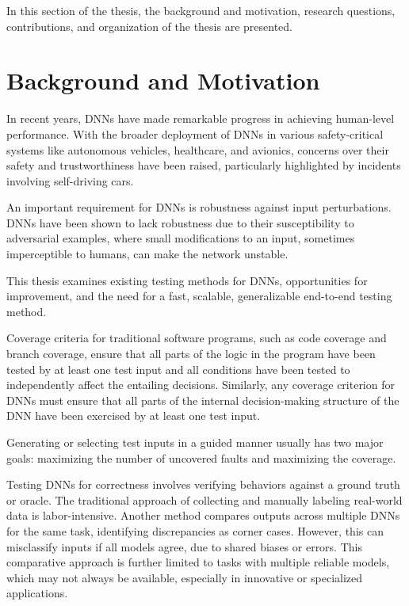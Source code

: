 In this section of the thesis, the background and motivation, research questions, contributions, and organization of the thesis are presented.

\section{Background and Motivation}

In recent years, DNNs have made remarkable progress in achieving human-level performance. With the broader deployment of DNNs in various safety-critical systems like autonomous vehicles, healthcare, and avionics, concerns over their safety and trustworthiness have been raised, particularly highlighted by incidents involving self-driving cars.

An important requirement for DNNs is robustness against input perturbations. DNNs have been shown to lack robustness due to their susceptibility to adversarial examples, where small modifications to an input, sometimes imperceptible to humans, can make the network unstable.

This thesis examines existing testing methods for DNNs, opportunities for improvement, and the need for a fast, scalable, generalizable end-to-end testing method.

Coverage criteria for traditional software programs, such as code coverage and branch coverage, ensure that all parts of the logic in the program have been tested by at least one test input and all conditions have been tested to independently affect the entailing decisions. Similarly, any coverage criterion for DNNs must ensure that all parts of the internal decision-making structure of the DNN have been exercised by at least one test input.

Generating or selecting test inputs in a guided manner usually has two major goals: maximizing the number of uncovered faults and maximizing the coverage.

Testing DNNs for correctness involves verifying behaviors against a ground truth or oracle. The traditional approach of collecting and manually labeling real-world data is labor-intensive. Another method compares outputs across multiple DNNs for the same task, identifying discrepancies as corner cases. However, this can misclassify inputs if all models agree, due to shared biases or errors. This comparative approach is further limited to tasks with multiple reliable models, which may not always be available, especially in innovative or specialized applications.



